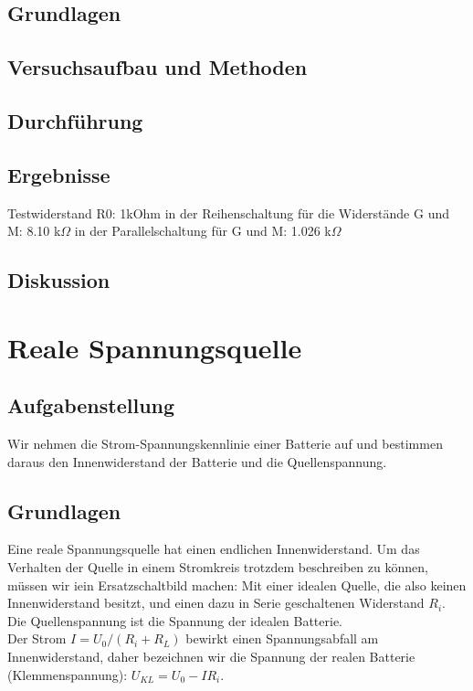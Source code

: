 \documentclass{article}
\begin{document}
\subsection{Grundlagen}
\subsection{Versuchsaufbau und Methoden}
\subsection{Durchführung}
\subsection{Ergebnisse}

Testwiderstand R0: 1kOhm
in der Reihenschaltung für die Widerstände G und M: 8.10 k$\Omega$
in der Parallelschaltung für G und M: 1.026 k$\Omega$
\subsection{Diskussion}

\section{Reale Spannungsquelle}

\subsection{Aufgabenstellung}
Wir nehmen die Strom-Spannungskennlinie einer Batterie auf und bestimmen daraus den Innenwiderstand der Batterie und die Quellenspannung.


\subsection{Grundlagen}
Eine reale Spannungsquelle hat einen endlichen Innenwiderstand. Um das Verhalten der Quelle in einem Stromkreis trotzdem beschreiben zu können, müssen wir iein Ersatzschaltbild machen: Mit einer idealen Quelle, die also keinen Innenwiderstand besitzt, und einen dazu in Serie geschaltenen Widerstand $R_i$.\\
Die Quellenspannung ist die Spannung der idealen Batterie.\\
Der Strom $I=U_0/(R_i+R_L)$ bewirkt einen Spannungsabfall am Innenwiderstand, daher bezeichnen wir die Spannung der realen Batterie (Klemmenspannung): $U_{KL}=U_0-IR_i$.
\end{document}
